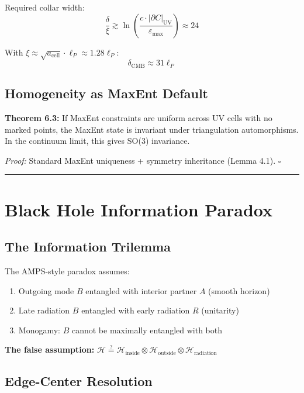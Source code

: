 Required collar width: \[\frac{\delta}{\xi} \gtrsim \ln\left(\frac{c \cdot |\partial C|_{\text{UV}}}{\varepsilon_{\text{max}}}\right) \approx 24\]

With \(\xi \approx \sqrt{a_{\text{cell}}} \cdot \ell_P \approx 1.28 \ell_P\): \[\delta_{\text{CMB}} \approx 31 \ell_P\]

\subsection{Homogeneity as MaxEnt Default}\label{63-homogeneity-as-maxent-default}

\textbf{Theorem 6.3:} If MaxEnt constraints are uniform across UV cells with no marked points, the MaxEnt state is invariant under triangulation automorphisms. In the continuum limit, this gives SO(3) invariance.

\emph{Proof:} Standard MaxEnt uniqueness + symmetry inheritance (Lemma 4.1). \(\square\)

\begin{center}\rule{0.5\linewidth}{0.5pt}\end{center}

\section{Black Hole Information Paradox}\label{7-black-hole-information-paradox}

\subsection{The Information Trilemma}\label{71-the-information-trilemma}

The AMPS-style paradox assumes:

\begin{enumerate}
\def\labelenumi{\arabic{enumi}.}
\tightlist
\item
 Outgoing mode \(B\) entangled with interior partner \(A\) (smooth horizon)
\item
 Late radiation \(B\) entangled with early radiation \(R\) (unitarity)
\item
 Monogamy: \(B\) cannot be maximally entangled with both
\end{enumerate}

\textbf{The false assumption:} \(\mathcal{H} \stackrel{?}{=} \mathcal{H}_{\text{inside}} \otimes \mathcal{H}_{\text{outside}} \otimes \mathcal{H}_{\text{radiation}}\)

\subsection{Edge-Center Resolution}\label{72-edge-center-resolution}


